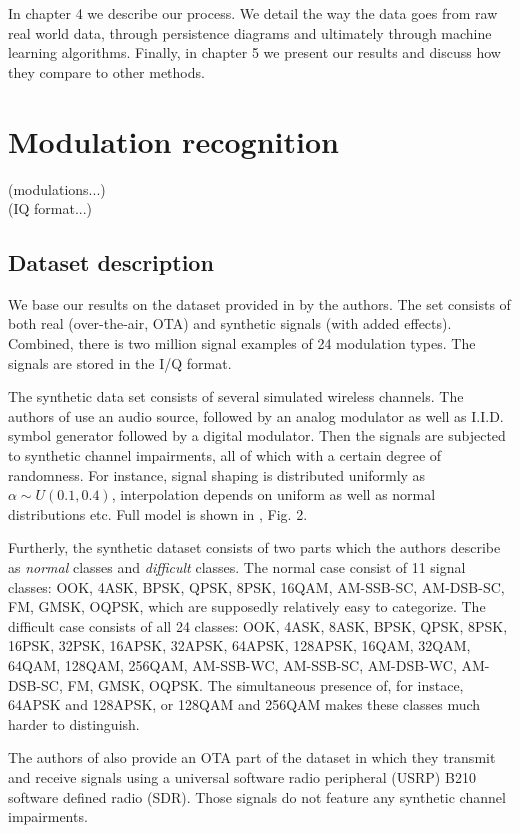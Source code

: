 \documentclass[12pt]{article}
\theoremstyle{plain}
\theoremstyle{definition}
\theoremstyle{remark}
\begin{document}
	In chapter 4 we describe our process. We detail the way the data goes from raw real world data, through persistence diagrams and ultimately through machine learning algorithms. Finally, in chapter 5 we present our results and discuss how they compare to other methods.
	
	\section{Modulation recognition}
	
	(modulations...)\\
	(IQ format...)
	
	\subsection{Dataset description}
	
	We base our results on the dataset provided in \cite{ORC} by the authors. The set consists of both real (over-the-air, OTA) and synthetic signals (with added effects). Combined, there is two million signal examples of 24 modulation types. The signals are stored in the I/Q format.
	
	The synthetic data set consists of several simulated wireless channels. The authors of \cite{ORC} use an audio source, followed by an analog modulator as well as I.I.D. symbol generator followed by a digital modulator. Then the signals are subjected to synthetic channel impairments, all of which with a certain degree of randomness. For instance, signal shaping is distributed uniformly as $\alpha \sim U(0.1, 0.4)$, interpolation depends on uniform as well as normal distributions etc. Full model is shown in \cite{ORC}, Fig. 2.
	
	Furtherly, the synthetic dataset consists of two parts which the authors describe as \textit{normal} classes and \textit{difficult} classes. The normal case consist of 11 signal classes: OOK, 4ASK, BPSK, QPSK, 8PSK, 16QAM, AM-SSB-SC, AM-DSB-SC, FM, GMSK, OQPSK, which are supposedly relatively easy to categorize. The difficult case consists of all 24 classes: OOK, 4ASK, 8ASK, BPSK, QPSK, 8PSK, 16PSK, 32PSK, 16APSK, 32APSK, 64APSK, 128APSK, 16QAM, 32QAM, 64QAM, 128QAM, 256QAM, AM-SSB-WC, AM-SSB-SC, AM-DSB-WC, AM-DSB-SC, FM, GMSK, OQPSK. The simultaneous presence of, for instace,  64APSK and 128APSK, or 128QAM and 256QAM makes these classes much harder to distinguish.
	
	The authors of \cite{ORC} also provide an OTA part of the dataset in which they transmit and receive signals using a universal software radio peripheral (USRP) B210 software defined radio (SDR). Those signals do not feature any synthetic channel impairments.
		
\end{document}

